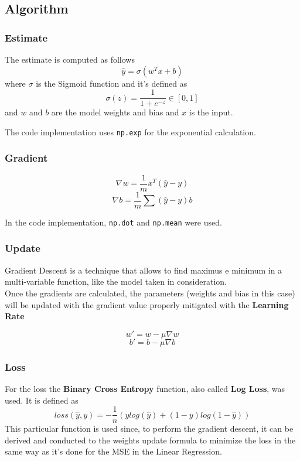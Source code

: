 \documentclass[
	letterpaper, %
	10pt, %
]{class}
\begin{document}
\subsection{Algorithm}

\subsubsection{Estimate}
The estimate is computed as follows
$$ \hat{y} = \sigma(w^Tx + b) $$
where $\sigma$ is the Sigmoid function \cite{sigmoid} and it's defined as
$$ \sigma(z) = \frac{1}{1 + e^{-z}} \in [0,1] $$
and $w$ and $b$ are the model weights and bias and $x$ is the input.

The code implementation uses \texttt{np.exp} for the exponential calculation.

\subsubsection{Gradient}

$$ \nabla w = \frac{1}{m}x^T(\hat{y} - y) $$
$$ \nabla b = \frac{1}{m}\sum(\hat{y} - y) b $$

In the code implementation, \texttt{np.dot} and \texttt{np.mean} were used.

\subsubsection{Update}

Gradient Descent \cite{sgd} is a technique that allows to find maximus e minimum in a multi-variable function, like the model taken in consideration.\\
Once the gradients are calculated, the parameters (weights and bias in this case) will be updated with the gradient value properly mitigated with the \textbf{Learning Rate}

$$ w' = w - \mu \nabla w $$
$$ b' = b - \mu \nabla b $$

\subsubsection{Loss}
For the loss the \textbf{Binary Cross Entropy} \cite{binarycrossentropy} function, also called \textbf{Log Loss}, was used.
It is defined as
$$ loss(\hat{y}, y) = -\frac{1}{n}(y log(\hat{y}) + (1-y)log(1-\hat{y})) $$
This particular function is used since, to perform the gradient descent, it can be derived and conducted to the weights update formula to minimize the loss in the same way as it's done for the MSE \cite{mse} in the Linear Regression.\\
\end{document}
